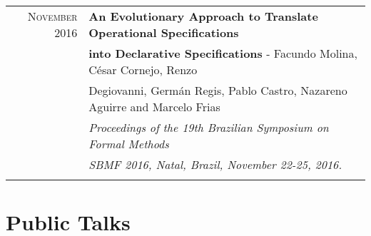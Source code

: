 \documentclass[a4paper,10pt]{article} %
\begin{document}
\begin{longtable}{rl}
\textsc{November} 2016 & \textbf{An Evolutionary Approach to Translate Operational Specifications} \\ & \textbf{into Declarative Specifications} - Facundo Molina, César Cornejo, Renzo \\
& Degiovanni, Germán Regis, Pablo Castro, Nazareno Aguirre and Marcelo Frias \\
& \textit{Proceedings of the 19th Brazilian Symposium on Formal Methods} \\ 
& \textit{SBMF 2016, Natal, Brazil, November 22-25, 2016.} \\ & \\

\end{longtable}

\section{Public Talks}
\end{document}
